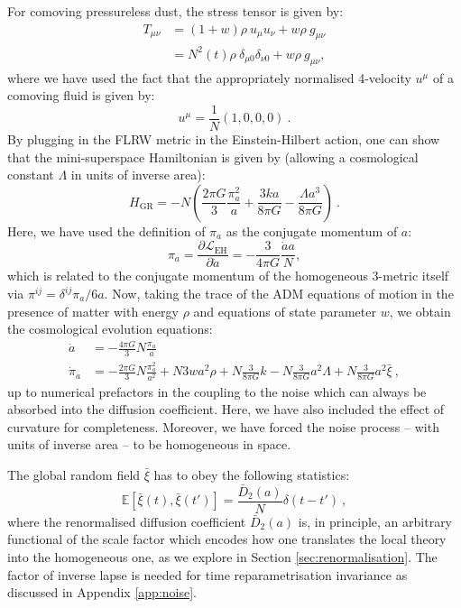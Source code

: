 \documentclass[amsmath,amssymb,11pt]{article}
\begin{document}
For comoving pressureless dust, the stress tensor is given by:
\begin{equation}
\begin{split}
    T_{\mu \nu}&= (1+w) \rho  \ u_{\mu} u_{\nu} +w \rho \ g_{\mu \nu} \\
    &=N^2(t) \rho \ \delta_{\mu 0}\delta_{\nu 0} + w\rho \ g_{\mu\nu} ,
\end{split}
\end{equation}
where we have used the fact that the appropriately normalised 4-velocity $u^\mu$ of a comoving fluid is given by:
\begin{equation}
    u^{\mu}=\frac{1}{N} (1,0,0,0) \ .
\end{equation}
By plugging in the FLRW metric in the Einstein-Hilbert action, one can show that the mini-superspace Hamiltonian is given by (allowing a cosmological constant $\Lambda$ in units of inverse area):
\begin{equation}
     H_\text{GR}=-N \left( \frac{2 \pi G}{3} \frac{\pi_a^2}{a}+ \frac{3ka}{8\pi G}-\frac{\Lambda a^3}{8\pi G} \right) \ .
\end{equation}
Here, we have used the definition of $\pi_a$ as the conjugate momentum of $a$:
\begin{equation}
    \pi_a = \frac{\partial \mathcal{L}_{\text{EH}}}{\partial\dot{a}} = -\frac{3}{4\pi G} \frac{\dot{a}a}{N} ,
\end{equation}
which is related to the conjugate momentum of the homogeneous 3-metric itself via $\pi^{ij}=\delta^{ij} \pi_a/6a $. Now, taking the trace of the ADM equations of motion in the presence of matter with energy $\rho$ and equations of state parameter $w$, we obtain the cosmological evolution equations:
\begin{align}
\label{eq:eom}
    \dot{a} &= -\frac{4\pi G}{3} N \frac{\pi_a}{a} \\
    \dot{\pi}_a &= - \frac{2 \pi G}{3} N\frac{\pi_a^2}{a^2}+N 3 wa^2 \rho + N \frac{3}{8\pi G} k - N\frac{3}{8\pi G}a^2\Lambda+N \frac{3}{8\pi G} a^2 \bar{\xi} \ ,
\end{align}
up to numerical prefactors in the coupling to the noise which can always be absorbed into the diffusion coefficient. Here, we have also included the effect of curvature for completeness. Moreover, we have forced the noise process -- with units of inverse area -- to be homogeneous in space. 

The global random field $\bar{\xi}$ has to obey the following statistics:
\begin{equation}
\label{eq:noise_gen}
     \mathbb{E}[\bar{\xi}(t),\bar{\xi}(t')] = \frac{\bar{D}_2 (a)}{N} \delta(t-t') \ ,
\end{equation}
where the renormalised diffusion coefficient $\bar{D}_2(a)$ is, in principle, an arbitrary functional of the scale factor which encodes how one translates the local theory into the homogeneous one, as we explore in Section \ref{sec:renormalisation}. The factor of inverse lapse is needed for time reparametrisation invariance as discussed in Appendix \ref{app:noise}.
\end{document}

